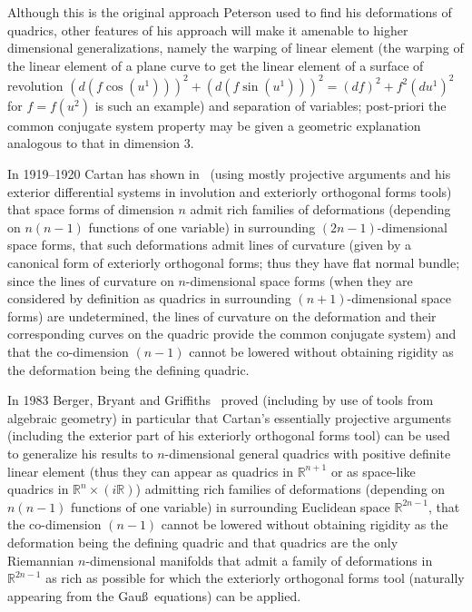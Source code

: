 \documentclass[pdftex]{sigma}
\begin{document}
Although this is the original approach Peterson used to f\/ind his
deformations of quadrics, other features of his approach will make
it amenable to higher dimensional generalizations, namely the
warping of linear element (the warping of the linear element of a
plane curve to get the linear element of a surface of revolution
$(d(f\cos(u^1)))^2+(d(f\sin(u^1)))^2=(df)^2+f^2(du^1)^2$ for
$f=f(u^2)$ is such an example) and separation of variables;
post-priori the common conjugate system property may be given a
geometric explanation analogous to that in dimension $3$.

In 1919--1920 Cartan has shown in~\cite{C} (using mostly projective
arguments and his exterior dif\/ferential systems in involution and
exteriorly orthogonal forms tools) that space forms of dimension
$n$ admit rich families of deformations (depending on $n(n-1)$
functions of one variable) in surrounding $(2n-1)$-dimensional
space forms, that such deformations admit lines of curvature
(given by a canonical form of exteriorly orthogonal forms; thus
they have f\/lat normal bundle; since the lines of curvature on
$n$-dimensional space forms (when they are considered by
def\/inition as quadrics in surrounding $(n+1)$-dimensional space
forms) are undetermined, the lines of curvature on the deformation
and their corresponding curves on the quadric provide the common
conjugate system) and that the co-dimension $(n-1)$ cannot be
lowered without obtaining rigidity as the deformation being the
def\/ining quadric.

In 1983 Berger, Bryant and Grif\/f\/iths~\cite{B} proved (including by
use of tools from algebraic geometry) in particular that Cartan's
essentially projective arguments (including the exterior part of
his exteriorly orthogonal forms tool) can be used to generalize
his results to $n$-dimensional general quadrics with positive
def\/inite linear element (thus they can appear as quadrics in
$\mathbb{R}^{n+1}$ or as space-like quadrics in
$\mathbb{R}^n\times(i\mathbb{R})$) admitting rich families of
deformations (depending on $n(n-1)$ functions of one variable) in
surrounding Euclidean space $\mathbb{R}^{2n-1}$, that the
co-dimension $(n-1)$ cannot be lowered without obtaining rigidity
as the deformation being the def\/ining quadric and that quadrics
are the only Riemannian $n$-dimensional manifolds that admit a
family of deformations in $\mathbb{R}^{2n-1}$ as rich as possible
for which the exteriorly orthogonal forms tool (naturally
appearing from the Gau\ss\ equations) can be applied.
\end{document}

